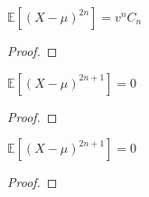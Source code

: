\begin{lemma}
  \label{lem:centralMoment_fun_two_mul_semicircleReal}
  \notready
   $\mathbb{E}[(X  - \mu)^{2n}] = v^n C_n $
   \begin{proof}
   \end{proof}
\end{lemma}


\begin{lemma}
  \label{lem:centralMoment_odd_semicircleReal}
  \notready
  $\mathbb{E}[(X  - \mu)^{2n + 1}] = 0 $
  \begin{proof}
   \end{proof}
\end{lemma}


\begin{lemma}
  \label{lem:centralMoment_fun_odd_semicircleReal}
  \notready
   $\mathbb{E}[(X  - \mu)^{2n + 1}] = 0 $
   \begin{proof}
   \end{proof}
\end{lemma}



